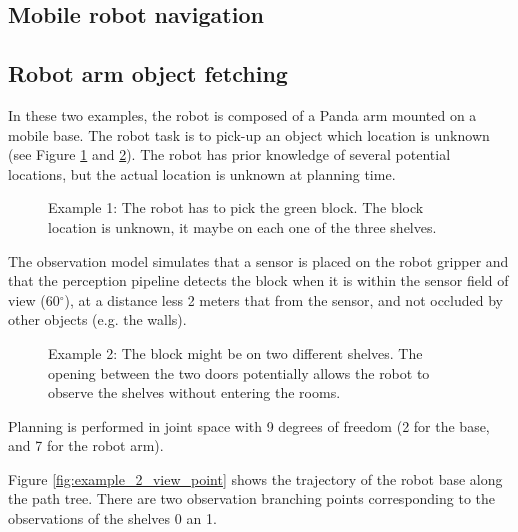 \documentclass[letterpaper, 10 pt, conference]{ieeeconf}  %
\begin{document}
\subsection{Mobile robot navigation} \label{experiment:navigation}

\subsection{Robot arm object fetching} \label{experiment:mobile_manipulation}
In these two examples, the robot is composed of a Panda arm mounted on a mobile base. The robot task is to pick-up an object which location is unknown (see Figure \ref{fig:arm_example_1} and \ref{fig:arm_example_2}). The robot has prior knowledge of several potential locations, but the actual location is unknown at planning time. 


\begin{figure}[!htb]
 \caption{Example 1: The robot has to pick the green block. The block location is unknown, it maybe on each one of the three shelves.}
 \label{fig:arm_example_1}
\end{figure}

The observation model simulates that a sensor is placed on the robot gripper and that the perception pipeline detects the block when it is within the sensor field of view (60$^{\circ}$), at a distance less 2 meters that from the sensor, and not occluded by other objects (e.g. the walls).

\begin{figure}[!htb]
 \caption{Example 2: The block might be on two different shelves. The opening between the two doors potentially allows the robot to observe the shelves without entering the rooms.}
 \label{fig:arm_example_2}
\end{figure}

Planning is performed in joint space with 9 degrees of freedom (2 for the base, and 7 for the robot arm).

Figure \ref{fig:example_2_view_point} shows the trajectory of the robot base along the path tree. There are two observation branching points corresponding to the observations of the shelves 0 an 1.
\end{document}
